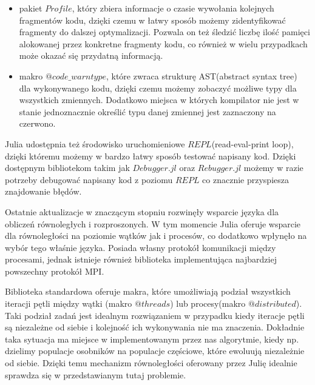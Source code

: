 \begin{itemize}
    \item pakiet $Profile$, który zbiera informacje o czasie wywołania kolejnych fragmentów kodu, dzięki czemu w łatwy sposób 
    możemy zidentyfikować fragmenty do dalszej optymalizacji. Pozwala on też śledzić liczbę ilość pamięci alokowanej przez konkretne fragmenty 
    kodu, co również w wielu przypadkach może okazać się przydatną informacją.
    \item makro $@code\_warntype$, które zwraca strukturę AST(abstract syntax tree) dla wykonywanego kodu, dzięki czemu możemy zobaczyć możliwe typy dla wszystkich zmiennych. 
    Dodatkowo miejsca w których kompilator nie jest w stanie jednoznacznie określić typu danej zmiennej jest zaznaczony na czerwono.
\end{itemize}

Julia udostępnia też środowisko uruchomieniowe $REPL$(read-eval-print loop), dzięki któremu możemy w bardzo łatwy sposób testować napisany kod. 
Dzięki dostępnym bibliotekom takim jak $Debugger.jl$ oraz $Rebugger.jl$ możemy w razie potrzeby debugować napisany kod z poziomu $REPL$ co 
znacznie przyspiesza znajdowanie błędów.

Ostatnie aktualizacje w znaczącym stopniu rozwinęły wsparcie języka dla obliczeń równoległych i rozproszonych. W tym momencie Julia oferuje wsparcie dla 
równoległości na poziomie wątków jak i procesów, co dodatkowo wpłynęło na wybór tego właśnie języka. Posiada własny protokół komunikacji między procesami, jednak 
istnieje również biblioteka implementująca najbardziej powszechny protokół MPI.

Biblioteka standardowa oferuje makra, które umożliwiają podział wszystkich iteracji pętli między wątki (makro $@threads$) lub procesy(makro $@distributed$). 
Taki podział zadań jest idealnym rozwiązaniem w przypadku kiedy iteracje pętli są niezależne od siebie i kolejność ich wykonywania nie ma 
znaczenia. Dokładnie taka sytuacja ma miejsce w implementowanym przez nas algorytmie, kiedy np. dzielimy populacje osobników na populacje 
częściowe, które ewoluują niezależnie od siebie. Dzięki temu mechanizm równoległości oferowany przez Julię idealnie sprawdza się w przedstawianym 
tutaj problemie.


